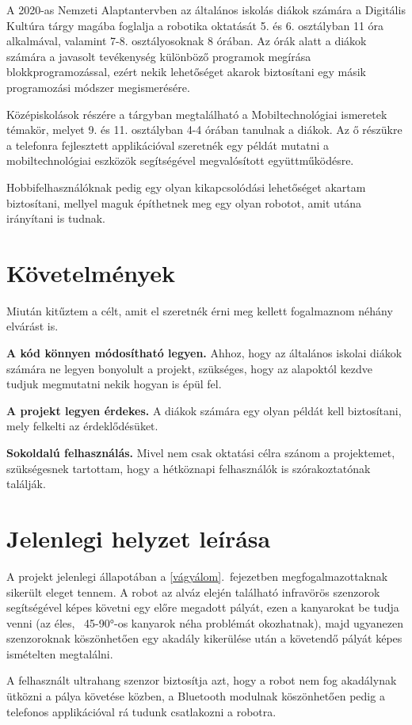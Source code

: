 \documentclass[]{thesis-ekf}
\theoremstyle{definition}
\begin{document}
A 2020-as Nemzeti Alaptantervben\cite{NAT} az általános iskolás diákok számára a Digitális Kultúra tárgy magába foglalja a robotika oktatását 5. és 6. osztályban 11 óra alkalmával, valamint 7-8. osztályosoknak 8 órában. Az órák alatt a diákok számára a javasolt tevékenység különböző programok megírása blokkprogramozással, ezért nekik lehetőséget akarok biztosítani egy másik programozási módszer megismerésére.

Középiskolások részére a tárgyban megtalálható a Mobiltechnológiai ismeretek témakör, melyet 9. és 11. osztályban 4-4 órában tanulnak a diákok. Az ő részükre a telefonra fejlesztett applikációval szeretnék egy példát mutatni a mobiltechnológiai eszközök segítségével megvalósított együttműködésre.

Hobbifelhasználóknak pedig egy olyan kikapcsolódási lehetőséget akartam biztosítani, mellyel maguk építhetnek meg egy olyan robotot, amit utána irányítani is tudnak.
\section{Követelmények}\label{követelmény}
Miután kitűztem a célt, amit el szeretnék érni meg kellett fogalmaznom néhány elvárást is.

\textbf{A kód könnyen módosítható legyen.} Ahhoz, hogy az általános iskolai diákok számára ne legyen bonyolult a projekt, szükséges, hogy az alapoktól kezdve tudjuk megmutatni nekik hogyan is épül fel.

\textbf{A projekt legyen érdekes.} A diákok számára egy olyan példát kell biztosítani, mely felkelti az érdeklődésüket.

\textbf{Sokoldalú felhasználás.} Mivel nem csak oktatási célra szánom a projektemet, szükségesnek tartottam, hogy a hétköznapi felhasználók is szórakoztatónak találják.
\section{Jelenlegi helyzet leírása}\label{jelenlegi_helyzet}
A projekt jelenlegi állapotában a \ref{vágyálom}.~fejezetben megfogalmazottaknak sikerült eleget tennem. A robot az alváz elején található infravörös szenzorok segítségével képes követni egy előre megadott pályát, ezen a kanyarokat be tudja venni (az éles, ~45-90°-os kanyarok néha problémát okozhatnak), majd ugyanezen szenzoroknak köszönhetően egy akadály kikerülése után a követendő pályát képes ismételten megtalálni.

A felhasznált ultrahang szenzor biztosítja azt, hogy a robot nem fog akadálynak ütközni a pálya követése közben, a Bluetooth modulnak köszönhetően pedig a telefonos applikációval rá tudunk csatlakozni a robotra.
\end{document}
